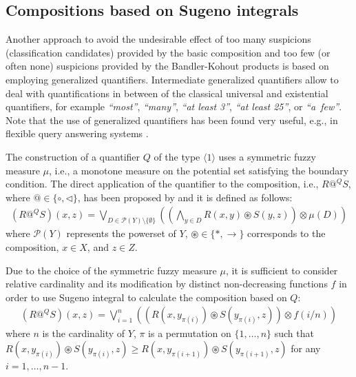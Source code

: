 \documentclass[review]{elsarticle}
\begin{document}
\subsection{Compositions based on Sugeno integrals}
\label{sec:compquant}

Another approach to avoid the undesirable effect of too many suspicions (classification candidates) provided by the basic composition and too few (or often none)  suspicions provided by the Bandler-Kohout products is based on employing generalized quantifiers. Intermediate generalized quantifiers allow to deal with quantifications in between of the classical universal and existential quantifiers, for example \emph{``most''}, \emph{``many''}, \emph{``at least 3''}, \emph{``at least 25''}, or \emph{``a~few''}. Note that the use of generalized quantifiers has been found very useful, e.g., in flexible query answering systems \citep{PivertBosc_book2012,lietard:SugenoFI_2003}.

The construction of a quantifier $Q$ of the type $\langle 1 \rangle$  \citep{dvorak2009} uses a symmetric fuzzy measure $\mu$, i.e., a monotone measure on the potential set satisfying the boundary condition. The direct application of the quantifier to the composition, i.e., $ R @^{Q} S $, where $ @\in \{\circ,\lhd \} $, has been proposed by \cite{Step2014,CaoStepHolc_Quant:EUSFLAT2015}  and it is defined as follows:
%
\begin{align}
(R@^{Q} S) (x,z)  = \bigvee_{D\in
    \mathcal{P}(Y)\setminus\{\emptyset\}} \left( \left(\bigwedge_{y\in
    D} R(x,y) \circledast S(y,z) \right) \otimes \mu(D) \right) \label{form_compQstandard}
\end{align}
%
where $\mathcal{P}(Y)$ represents the powerset of $Y$, $\circledast\in\{*,\rightarrow \}$ corresponds to the composition,  $x\in X$, and $z\in Z$.
    

Due to the choice of the symmetric fuzzy measure $\mu$, it is sufficient to consider relative cardinality and its modification by distinct non-decreasing functions $f$ in order to use  Sugeno integral \citep{KlementMesiarPap_IEEE2010} to calculate the composition based on $Q$: 
%
\begin{align}
(R@^{Q} S) (x,z) =  \bigvee_{i=1}^n \left( \left( R(x,y_{\pi(i)})
\circledast S(y_{\pi(i)}, z) \right) \otimes f(i/n) \right) \label{form_calcu_@}
\end{align}
%
where $n$ is the cardinality of $Y$,  $\pi$ is a permutation on $\{ 1, \dots , n\}$ such that
$R(x,y_{\pi(i)}) \circledast S(y_{\pi(i)},z) \ge R(x,y_{\pi(i+1)})
\circledast S(y_{\pi(i+1)},z)$ for any $i = 1, \dots , n-1$.
\end{document}
